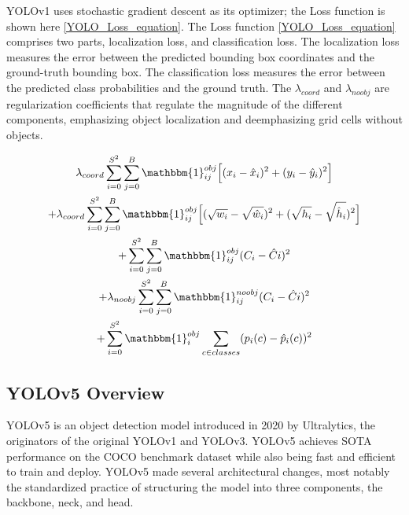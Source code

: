 \documentclass[10pt,twocolumn,letterpaper]{article}
\begin{document}

YOLOv1 uses stochastic gradient descent as its optimizer; the Loss function is shown here \ref{YOLO_Loss_equation}. The Loss function \ref{YOLO_Loss_equation} comprises two parts, localization loss, and classification loss. The localization loss measures the error between the predicted bounding box coordinates and the ground-truth bounding box. The classification loss measures the error between the predicted class probabilities and the ground truth. The $\lambda_{coord}$ and $\lambda_{noobj}$ are regularization coefficients that regulate the magnitude of the different components, emphasizing object localization and deemphasizing grid cells without objects. 

\begin{multline} \label{YOLO_Loss_equation}
\lambda_{coord}\sum_{i=0}^{S^2}\sum_{j=0}^{B}\mathbbm{1}_{ij}^{obj}\Big[(x_i-\hat{x}_i)^2+(y_i-\hat{y}_i)^2\Big] \\ + \lambda_{coord}\sum_{i=0}^{S^2}\sum_{j=0}^{B}\mathbbm{1}_{ij}^{obj}\Big[(\sqrt{w_i}-\sqrt{\hat{w}_i})^2+(\sqrt{h_i}-\sqrt{\hat{h}_i})^2\Big]\\
+\sum_{i=0}^{S^2}\sum_{j=0}^{B}\mathbbm{1}_{ij}^{obj}(C_i-\hat{C}i)^2\\
+\lambda_{noobj}\sum_{i=0}^{S^2}\sum_{j=0}^{B}\mathbbm{1}_{ij}^{noobj}(C_i-\hat{C}i)^2\\
+\sum_{i=0}^{S^2}\mathbbm{1}_{i}^{obj}\sum_{c\in classes}(p_i(c)-\hat{p}_i(c))^2
\end{multline}

\subsection{YOLOv5 Overview}

YOLOv5 \cite{Drone-Detection-Using-YOLOv5} is an object detection model introduced in 2020 by Ultralytics, the originators of the original YOLOv1 and YOLOv3. YOLOv5 achieves SOTA performance on the COCO benchmark dataset \cite{YOLOv5 doc} while also being fast and efficient to train and deploy. YOLOv5 made several architectural changes, most notably the standardized practice of structuring the model into three components, the backbone, neck, and head.
\end{document}
